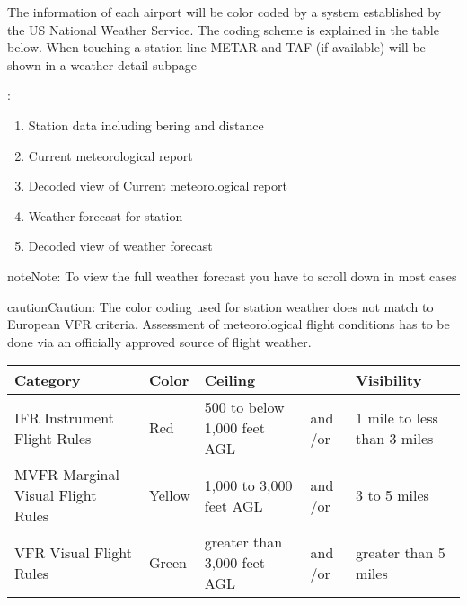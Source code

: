\documentclass[letterpaper,10pt,english]{sphinxmanual}
\begin{document}
The information of each airport will be color coded by a system established by the US National Weather Service. The coding scheme is explained in the table below.
When touching a station line METAR and TAF (if available) will be shown in a weather detail sub\sphinxhyphen{}page

\begin{figure}[htbp]
\centering

\noindent{}
\end{figure}

:
\begin{enumerate}
%
\item {} 
Station data including bering and distance

\item {} 
Current meteorological report

\item {} 
Decoded view of Current meteorological report

\item {} 
Weather forecast for station

\item {} 
Decoded view of weather forecast

\end{enumerate}

\begin{sphinxadmonition}{note}{Note:}
To view the full weather forecast you have to scroll down in most cases
\end{sphinxadmonition}

\begin{sphinxadmonition}{caution}{Caution:}
The color coding used for station weather does not match to European VFR criteria. Assessment of  meteorological flight conditions has to be done via an officially approved source of flight weather.
\end{sphinxadmonition}


\begin{savenotes}\sphinxattablestart
\centering
\begin{tabulary}{\linewidth}[t]{|T|T|T|T|T|}
\hline
\sphinxstyletheadfamily 
Category
&\sphinxstyletheadfamily 
Color
&\sphinxstyletheadfamily 
Ceiling
&\sphinxstyletheadfamily &\sphinxstyletheadfamily 
Visibility
\\
\hline
IFR
Instrument Flight Rules
&
Red
&
500 to below
1,000 feet AGL
&
and
/or
&
1 mile to
less than 3 miles
\\
\hline
MVFR
Marginal Visual Flight Rules
&
Yellow
&
1,000 to
3,000 feet AGL
&
and
/or
&
3 to 5 miles
\\
\hline
VFR
Visual Flight Rules
&
Green
&
greater than
3,000 feet AGL
&
and
/or
&
greater than
5 miles
\\
\hline
\end{tabulary}
\par
\sphinxattableend\end{savenotes}
\end{document}
